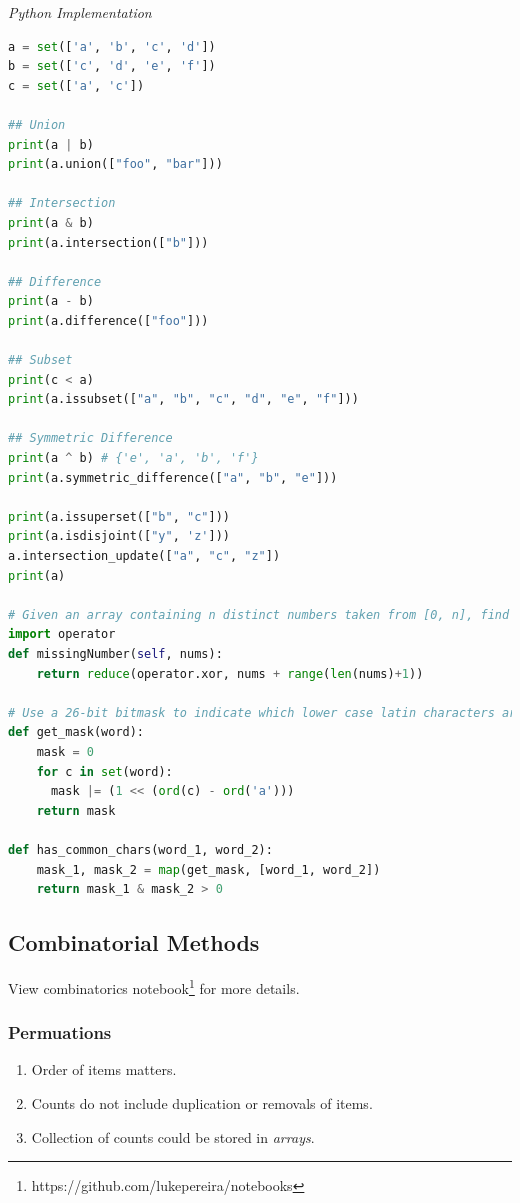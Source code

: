 \documentclass{article}
\begin{document}
    

\vspace{8pt} \emph{Python Implementation}
\begin{lstlisting}[language=Python]
a = set(['a', 'b', 'c', 'd'])
b = set(['c', 'd', 'e', 'f'])
c = set(['a', 'c'])

## Union
print(a | b)
print(a.union(["foo", "bar"]))

## Intersection
print(a & b)
print(a.intersection(["b"]))

## Difference
print(a - b)
print(a.difference(["foo"]))

## Subset
print(c < a)
print(a.issubset(["a", "b", "c", "d", "e", "f"]))

## Symmetric Difference
print(a ^ b) # {'e', 'a', 'b', 'f'}
print(a.symmetric_difference(["a", "b", "e"]))

print(a.issuperset(["b", "c"]))
print(a.isdisjoint(["y", 'z']))
a.intersection_update(["a", "c", "z"])
print(a)

# Given an array containing n distinct numbers taken from [0, n], find the one that is missing from the array.
import operator
def missingNumber(self, nums):
    return reduce(operator.xor, nums + range(len(nums)+1))

# Use a 26-bit bitmask to indicate which lower case latin characters are inside the string.
def get_mask(word):
    mask = 0
    for c in set(word):
      mask |= (1 << (ord(c) - ord('a')))
    return mask
    
def has_common_chars(word_1, word_2):
    mask_1, mask_2 = map(get_mask, [word_1, word_2])
    return mask_1 & mask_2 > 0
\end{lstlisting}    

\subsection{Combinatorial Methods}

    View combinatorics notebook\footnote{https://github.com/lukepereira/notebooks} for more details.

    \subsubsection{Permuations}
    \begin{enumerate}
        \item Order of items matters.
        \item Counts do not include duplication or removals of items.
        \item Collection of counts could be stored in \emph{arrays}. 
    \end{enumerate} 
    
\end{document}
